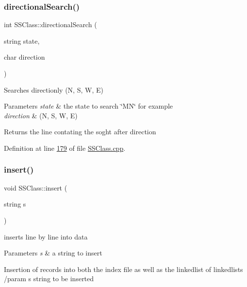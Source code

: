 \subsubsection{\texorpdfstring{directional\+Search()}{directionalSearch()}}
{\footnotesize\ttfamily int S\+S\+Class\+::directional\+Search (\begin{DoxyParamCaption}\item[{string}]{state,  }\item[{char}]{direction }\end{DoxyParamCaption})}



Searches directionly (N, S, W, E) 


\begin{DoxyParams}{Parameters}
{\em state} & the state to search \char`\"{}\+M\+N\char`\"{} for example \\
\hline
{\em direction} & (N, S, W, E) \\
\hline
\end{DoxyParams}
\begin{DoxyReturn}{Returns}
the line contating the soght after direction 
\end{DoxyReturn}


Definition at line \hyperlink{SSClass_8cpp_source_l00179}{179} of file \hyperlink{SSClass_8cpp_source}{S\+S\+Class.\+cpp}.

\mbox{\label{classSSClass_a45c5585c784bf7c4f823f66426664aea}} 
\subsubsection{\texorpdfstring{insert()}{insert()}}
{\footnotesize\ttfamily void S\+S\+Class\+::insert (\begin{DoxyParamCaption}\item[{string}]{s }\end{DoxyParamCaption})}



inserts line by line into data 


\begin{DoxyParams}{Parameters}
{\em s} & a string to insert\\
\hline
\end{DoxyParams}
Insertion of records into both the index file as well as the linkedlist of linkedlists /param s string to be inserted 

